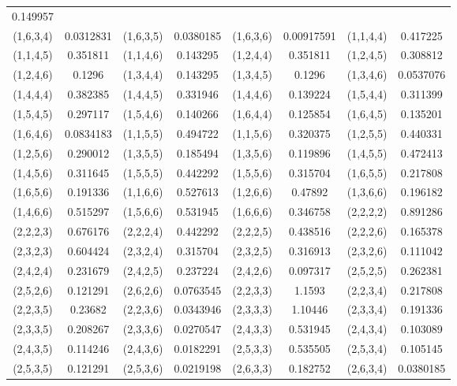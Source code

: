 \documentclass[hidelinks]{ctexart}
\begin{document}
\begin{longtable}{cccccccc}
0.149957
\\
(1,6,3,4) & 
0.0312831
 & 
(1,6,3,5) & 
0.0380185
 & 
(1,6,3,6) & 
0.00917591
 & 
(1,1,4,4) & 
0.417225
\\
(1,1,4,5) & 
0.351811
 & 
(1,1,4,6) & 
0.143295
 & 
(1,2,4,4) & 
0.351811
 & 
(1,2,4,5) & 
0.308812
\\
(1,2,4,6) & 
0.1296
 & 
(1,3,4,4) & 
0.143295
 & 
(1,3,4,5) & 
0.1296
 & 
(1,3,4,6) & 
0.0537076
\\
(1,4,4,4) & 
0.382385
 & 
(1,4,4,5) & 
0.331946
 & 
(1,4,4,6) & 
0.139224
 & 
(1,5,4,4) & 
0.311399
\\
(1,5,4,5) & 
0.297117
 & 
(1,5,4,6) & 
0.140266
 & 
(1,6,4,4) & 
0.125854
 & 
(1,6,4,5) & 
0.135201
\\
(1,6,4,6) & 
0.0834183
 & 
(1,1,5,5) & 
0.494722
 & 
(1,1,5,6) & 
0.320375
 & 
(1,2,5,5) & 
0.440331
\\
(1,2,5,6) & 
0.290012
 & 
(1,3,5,5) & 
0.185494
 & 
(1,3,5,6) & 
0.119896
 & 
(1,4,5,5) & 
0.472413
\\
(1,4,5,6) & 
0.311645
 & 
(1,5,5,5) & 
0.442292
 & 
(1,5,5,6) & 
0.315704
 & 
(1,6,5,5) & 
0.217808
\\
(1,6,5,6) & 
0.191336
 & 
(1,1,6,6) & 
0.527613
 & 
(1,2,6,6) & 
0.47892
 & 
(1,3,6,6) & 
0.196182
\\
(1,4,6,6) & 
0.515297
 & 
(1,5,6,6) & 
0.531945
 & 
(1,6,6,6) & 
0.346758
 & 
(2,2,2,2) & 
0.891286
\\
(2,2,2,3) & 
0.676176
 & 
(2,2,2,4) & 
0.442292
 & 
(2,2,2,5) & 
0.438516
 & 
(2,2,2,6) & 
0.165378
\\
(2,3,2,3) & 
0.604424
 & 
(2,3,2,4) & 
0.315704
 & 
(2,3,2,5) & 
0.316913
 & 
(2,3,2,6) & 
0.111042
\\
(2,4,2,4) & 
0.231679
 & 
(2,4,2,5) & 
0.237224
 & 
(2,4,2,6) & 
0.097317
 & 
(2,5,2,5) & 
0.262381
\\
(2,5,2,6) & 
0.121291
 & 
(2,6,2,6) & 
0.0763545
 & 
(2,2,3,3) & 
1.1593
 & 
(2,2,3,4) & 
0.217808
\\
(2,2,3,5) & 
0.23682
 & 
(2,2,3,6) & 
0.0343946
 & 
(2,3,3,3) & 
1.10446
 & 
(2,3,3,4) & 
0.191336
\\
(2,3,3,5) & 
0.208267
 & 
(2,3,3,6) & 
0.0270547
 & 
(2,4,3,3) & 
0.531945
 & 
(2,4,3,4) & 
0.103089
\\
(2,4,3,5) & 
0.114246
 & 
(2,4,3,6) & 
0.0182291
 & 
(2,5,3,3) & 
0.535505
 & 
(2,5,3,4) & 
0.105145
\\
(2,5,3,5) & 
0.121291
 & 
(2,5,3,6) & 
0.0219198
 & 
(2,6,3,3) & 
0.182752
 & 
(2,6,3,4) & 
0.0380185
\\

\end{longtable}
\end{document}
